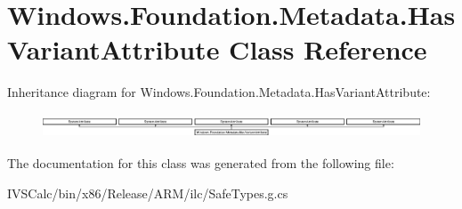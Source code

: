\hypertarget{class_windows_1_1_foundation_1_1_metadata_1_1_has_variant_attribute}{}\section{Windows.\+Foundation.\+Metadata.\+Has\+Variant\+Attribute Class Reference}
\label{class_windows_1_1_foundation_1_1_metadata_1_1_has_variant_attribute}
Inheritance diagram for Windows.\+Foundation.\+Metadata.\+Has\+Variant\+Attribute\+:\begin{figure}[H]
\begin{center}
\leavevmode
\includegraphics[height=0.729642cm]{class_windows_1_1_foundation_1_1_metadata_1_1_has_variant_attribute}
\end{center}
\end{figure}


The documentation for this class was generated from the following file\+:\begin{DoxyCompactItemize}
\item 
I\+V\+S\+Calc/bin/x86/\+Release/\+A\+R\+M/ilc/Safe\+Types.\+g.\+cs\end{DoxyCompactItemize}

